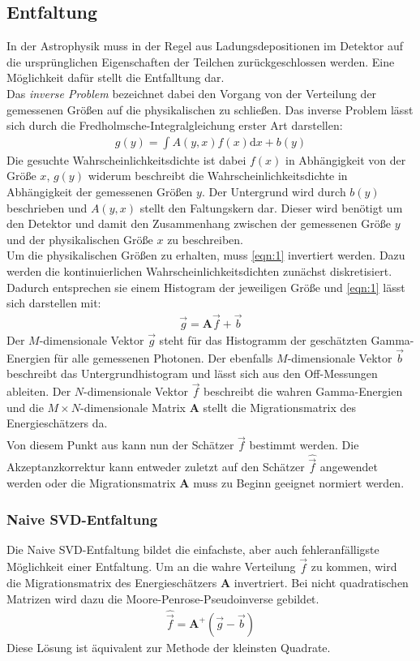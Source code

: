 \subsection{Entfaltung}
In der Astrophysik muss in der Regel aus Ladungsdepositionen im Detektor auf die ursprünglichen Eigenschaften der Teilchen zurückgeschlossen werden. Eine Möglichkeit dafür stellt die Entfalltung dar.\\
Das \textit{inverse Problem} bezeichnet dabei den Vorgang von der Verteilung der gemessenen Größen auf die physikalischen zu schließen. Das inverse Problem lässt sich durch die Fredholmsche-Integralgleichung erster Art darstellen:
\begin{align}
	g(y)=\int A(y,x)f(x)\text{d}x + b(y)
	\label{eqn:1}
\end{align}
Die gesuchte Wahrscheinlichkeitsdichte ist dabei $f(x)$ in Abhängigkeit von der Größe $x$, $g(y)$ widerum beschreibt die Wahrscheinlichkeitsdichte in Abhängigkeit der gemessenen Größen $y$. Der Untergrund wird durch $b(y)$ beschrieben und $A(y,x)$ stellt den Faltungskern dar. Dieser wird benötigt um den Detektor und damit den Zusammenhang zwischen der gemessenen Größe $y$ und der physikalischen Größe $x$ zu beschreiben. \\
Um die physikalischen Größen zu erhalten, muss \eqref{eqn:1} invertiert werden. Dazu werden die kontinuierlichen Wahrscheinlichkeitsdichten zunächst diskretisiert. Dadurch entsprechen sie einem Histogram der jeweiligen Größe und \eqref{eqn:1} lässt sich darstellen mit:
\begin{align}
	\vec{g} = \pmb{A}\vec{f} + \vec{b}
\end{align}
Der $M$-dimensionale Vektor $\vec{g}$ steht für das Histogramm der geschätzten Gamma-Energien für alle gemessenen Photonen. Der ebenfalls $M$-dimensionale Vektor $\vec{b}$ beschreibt das Untergrundhistogram und lässt sich aus den Off-Messungen ableiten. Der $N$-dimensionale Vektor $\vec{f}$ beschreibt die wahren Gamma-Energien und die $M\times N$-dimensionale Matrix $\pmb{A}$ stellt die Migrationsmatrix des Energieschätzers da. \\
Von diesem Punkt aus kann nun der Schätzer $\hat{\vec{f}}$ bestimmt werden. Die Akzeptanzkorrektur kann entweder zuletzt auf den Schätzer $\hat{\vec{f}}$ angewendet werden oder die Migrationsmatrix $\pmb{A}$ muss zu Beginn geeignet normiert werden.
\subsubsection{Naive SVD-Entfaltung}
Die Naive SVD-Entfaltung bildet die einfachste, aber auch fehleranfälligste Möglichkeit einer Entfaltung. Um an die wahre Verteilung $\vec{f}$ zu kommen, wird die Migrationsmatrix des Energieschätzers $\pmb{A}$ invertriert. Bei nicht quadratischen Matrizen wird dazu die Moore-Penrose-Pseudoinverse gebildet.\\
\begin{align}
	\hat{\vec{f}} = \pmb{A}^{+}(\vec{g} - \vec{b})
	\label{eqn:NSVD}
\end{align}
Diese Lösung ist äquivalent zur Methode der kleinsten Quadrate.
